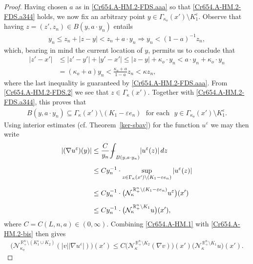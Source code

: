 \documentclass[10pt,a4paper]{amsart}
\newcommand{\meanint}{{\int{\mkern-19mu}-}}
\begin{document}
\begin{proof}
Having chosen $a$ as in \eqref{Cr654.A-HM.2-FDS.aaa} so that \eqref{Cr654.A-HM.2-FDS.a344} holds, we now fix an arbitrary point 
$y\in\Gamma_{\kappa_o}(x')\setminus K_1^\varepsilon$. Observe that having $z=(z',z_n)\in B(y,a\cdot y_n)$ entails 
%
\begin{align}\label{Cr654.A-HM.2-FDS.1}
y_n\leq z_n+|z-y|<z_n+a\cdot y_n\Longrightarrow y_n<(1-a)^{-1}z_n,
\end{align}
%
which, bearing in mind the current location of $y$, permits us to conclude that  
%
\begin{align}\label{Cr654.A-HM.2-FDS.2}
|z'-x'| &\leq|z'-y'|+|y'-x'|\leq|z-y|+\kappa_o\cdot y_n<a\cdot y_n+\kappa_o\cdot y_n
\nonumber\\[6pt]
&=(\kappa_o+a)y_n<\frac{\kappa_o+a}{1-a}z_n<\kappa z_n,
\end{align}
%
where the last inequality is guaranteed by \eqref{Cr654.A-HM.2-FDS.aaa}.
From \eqref{Cr654.A-HM.2-FDS.2} we see that $z\in\Gamma_{\kappa}(x')$.
Together with \eqref{Cr654.A-HM.2-FDS.a344}, this proves that 
%
\begin{align}\label{Cr654.A-HM.2-FDS.a344.ag}
B(y,a\cdot y_n)\subseteq\Gamma_{\kappa}(x')\setminus(K_1-\varepsilon e_n)\,\,\text{ for each }\,\,
y\in\Gamma_{\kappa_o}(x')\setminus K_1^\varepsilon.
\end{align}
%
Using interior estimates (cf. Theorem~\ref{ker-sbav}) for the function $u^\varepsilon$ we may then write 
%
\begin{align}\label{Cr654.A-HM.2-bis}
|(\nabla u^\varepsilon)(y)| &\leq\frac{C}{y_n}\meanint_{B(y,a\cdot y_n)}|u^\varepsilon(z)|\,dz
\nonumber\\[6pt]
&\leq Cy_n^{-1}\cdot
\sup_{z\in\Gamma_{\kappa}(x')\setminus(K_1-\varepsilon e_n)}|u^\varepsilon(z)|
\nonumber\\[6pt]
&\leq Cy_n^{-1}\cdot\big({\mathcal{N}}_{\kappa}^{\,\mathbb{R}^{n}_{+}\setminus (K_1-\varepsilon e_n)}u^\varepsilon\big)(x')
\nonumber\\[6pt]
&\leq Cy_n^{-1}\cdot\big({\mathcal{N}}_{\kappa}^{\,\mathbb{R}^{n}_{+}\setminus K_1}u\big)(x'),
\end{align}
%
where $C=C(L,n,a)\in(0,\infty)$. Combining \eqref{Cr654.A-HM.1} with \eqref{Cr654.A-HM.2-bis} then gives
%
\begin{align}\label{Cr654.A-HM.2-b22}
\big({\mathcal{N}}^{\,\mathbb{R}^{n}_{+}\setminus (K_1^\varepsilon\cup K_2)}_{\kappa_o}
(|v||\nabla u^\varepsilon|)\big)(x')
\leq C\big({\mathcal{N}}^{\,\mathbb{R}^{n}_{+}\setminus K_2}_{\kappa}(\nabla v)\big)(x')
\big({\mathcal{N}}^{\,\mathbb{R}^{n}_{+}\setminus K_1}_{\kappa}u\big)(x').

\end{align}
\end{proof}
\end{document}
